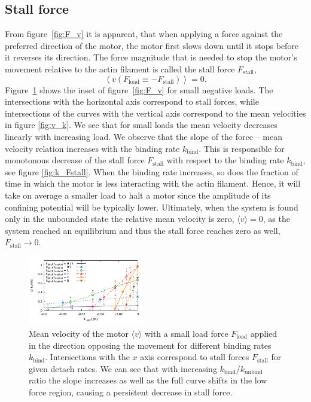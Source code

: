 \documentclass[aps,pre,twocolumn,showpacs,showkeys,superscriptaddress,floatfix]{revtex4-1}
\begin{document}
\subsection{Stall force}
From figure~\ref{fig:F_v} it is apparent, that when applying a force against the preferred direction of the motor, 
the motor first slows down until it stops before it reverses its direction. 
The force magnitude that is needed to stop the motor's movement relative to the actin filament is called the stall force $F_\text{stall}$,  
\[
\left\langle v ( F_\text{load} \equiv -F_\text{stall} ) \right\rangle = 0 .
\]
Figure~\ref{fig:F_v_zoom} shows the inset of figure~\ref{fig:F_v} for small negative loads. 
The intersections with the horizontal axis correspond to stall forces,  
while intersections of the curves with the vertical axis correspond to the mean velocities in figure \ref{fig:v_k}. 
We see that for small loads the mean velocity decreases linearly with increasing load. 
We observe that the slope of the force -- mean velocity relation increases with the binding rate $k_\text{bind}$. 
This is responsible for monotonous decrease of the stall force $F_\text{stall}$ with respect to the binding rate $k_\text{bind}$, see figure \ref{fig:k_Fstall}.
When the binding rate increases, so does the fraction of time in which the motor is less interacting with the actin filament. 
Hence, it will take on average a smaller load to halt a motor since the amplitude of its confining potential will be typically lower.
Ultimately, when the system is found only in the unbounded state the relative mean velocity is zero, $\langle v \rangle = 0$, as the system reached an equilibrium 
and thus the stall force reaches zero as well, $F_\text{stall} \to 0$.
\begin{figure}[t]
\centering
\includegraphics[width=0.45\textwidth,height=!]{F_v_zoom}
\caption{
\label{fig:F_v_zoom} 
Mean velocity of the motor $\langle v \rangle$ with a small load force $F_\text{load}$ applied in the direction opposing the movement for different binding rates $k_\text{bind}$.
Intersections with the $x$ axis correspond to stall forces $F_\text{stall}$ for given detach rates. 
We can see that with increasing $k_\text{bind}/k_\text{unbind}$ ratio the slope increases as well as the full curve shifts in the low force region, causing a persistent decrease in stall force.  
}
\end{figure}
\end{document}
